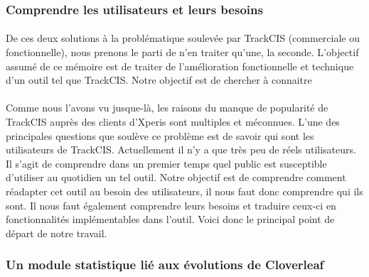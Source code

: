 		\subsubsection{Comprendre les utilisateurs et leurs besoins}
			\paragraph{}%
			De ces deux solutions à la problématique soulevée par TrackCIS (commerciale
			ou fonctionnelle), nous prenons le parti de n'en traiter qu'une, la
			seconde.\newline
			L'objectif assumé de ce mémoire est de traiter de l'amélioration
			fonctionnelle et technique d'un outil tel que TrackCIS. Notre objectif est de
			chercher à connaitre
			
			\paragraph{}%
			Comme nous l'avons vu jusque-là, les raisons du manque de
			popularité de TrackCIS auprès des clients d'Xperis sont multiples et
			méconnues. L'une des principales questions que soulève ce problème est de
			savoir qui sont les utilisateurs de TrackCIS. Actuellement il n'y a que très
			peu de réels utilisateurs. Il s'agit de comprendre dans un premier temps quel
			public est susceptible d'utiliser au quotidien un tel outil. Notre objectif
			est de comprendre comment réadapter cet outil au besoin des utilisateurs, il
			nous faut donc comprendre qui ils sont. Il nous faut également comprendre
			leurs besoins et traduire ceux-ci en fonctionnalités implémentables dans
			l'outil. Voici donc le principal point de départ de notre travail.
			
		\subsubsection{Un module statistique lié aux évolutions de Cloverleaf}
